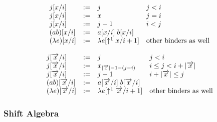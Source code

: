 $$
\begin{array}{lllll} 
    j [x/i]
    &:=&
    j               & j < i
    \\
    j[x / i]
    &:=&
    x               & j = i
    \\
    j [x / i] &:=& j - 1  & i < j
    \\
    (a b)[x /i] &:=&
    a[x / i] \; b[x / i]
    \\
    (\lambda e)[x / i]
    &:=&
    \lambda  e[\uparrow^{1} x / i + 1] & \text{other binders as well}
 \end{array}
$$



$$
\begin{array}{lllll} 
    j [ {\overrightarrow {x}} / i]
    &:=&
    j               & j < i
    \\
    j[{\overrightarrow {x}} / i]
    &:=&
    x_{|{\overrightarrow {x}}| - 1 - (j - i)}
    & i \le j < i + |{\overrightarrow {x}}|
    \\
    j [{\overrightarrow {x}} / i] &:=&
    j - 1  & i + |{\overrightarrow {x}}|  \le j
    \\
    (a b)[{\overrightarrow {x}} /i] &:=&
    a[{\overrightarrow {x}} / i] \; b[{\overrightarrow {x}} / i]
    \\
    (\lambda e)[{\overrightarrow {x}} / i]
    &:=&
    \lambda  e[\uparrow^{1} {\overrightarrow {x}} / i + 1] & \text{other binders as well}
 \end{array}
$$





\subsubsection{Shift Algebra}

